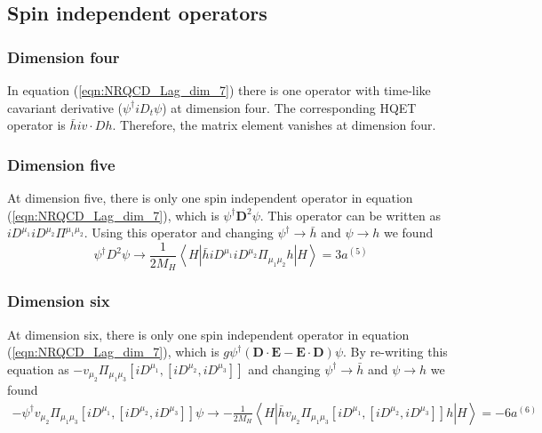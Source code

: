 \subsection{Spin independent operators}
\subsubsection{Dimension four}
\vspace{-0.2cm}
In equation (\ref{eqn:NRQCD_Lag_dim_7}) there is one operator with time-like cavariant derivative ($\psi^{\dagger}iD_{t}\psi$) at dimension four. The corresponding HQET operator is $\bar{h}iv\cdot Dh$. Therefore, the matrix element vanishes at dimension four.
\vspace{-0.5cm}
\subsubsection{Dimension five}
\vspace{-0.2cm}
At dimension five, there is only one spin independent operator in equation (\ref{eqn:NRQCD_Lag_dim_7}), which is $\psi^{\dagger}\bm{D}^2\psi$. This operator can be written as $iD^{\mu_1}iD^{\mu_2}\Pi^{\mu_1\mu_2}$. Using this operator and changing $\psi^{\dagger}\to\bar{h}$ and $\psi\to h$ we found
\begin{equation}
\psi^{\dagger} D^{2} \psi \rightarrow \frac{1}{2 M_{H}}\left\langle H\left|\bar{h} i D^{\mu_{1}} i D^{\mu_{2}} \Pi_{\mu_{1} \mu_{2}} h\right| H\right\rangle= 3 a^{(5)}
\end{equation}
\vspace{-1.5cm}
\subsubsection{Dimension six}
\vspace{-0.2cm}
At dimension six, there is only one spin independent operator in equation (\ref{eqn:NRQCD_Lag_dim_7}), which is $
g \psi^{\dagger}(\bm{D} \cdot \bm{E}-\bm{E} \cdot \bm{D}) \psi$. By re-writing this equation as $-v_{\mu_{2}} \Pi_{\mu_{1} \mu_{3}}\left[i D^{\mu_{1}},\left[i D^{\mu_{2}}, i D^{\mu_{3}}\right]\right]$ and changing $\psi^{\dagger}\to \bar{h}$ and $\psi\to h$ we found
\begin{eqnarray}
-\psi^{\dagger} v_{\mu_{2}} \Pi_{\mu_{1} \mu_{3}}\left[i D^{\mu_{1}},\left[i D^{\mu_{2}}, i D^{\mu_{3}}\right]\right] \psi \rightarrow-\frac{1}{2 M_{H}}\left\langle H\left|\bar{h} v_{\mu_{2}} \Pi_{\mu_{1} \mu_{3}}\left[i D^{\mu_{1}},\left[i D^{\mu_{2}}, i D^{\mu_{3}}\right]\right] h\right| H\right\rangle=- 6 a^{(6)}\nonumber\\
\end{eqnarray} 

